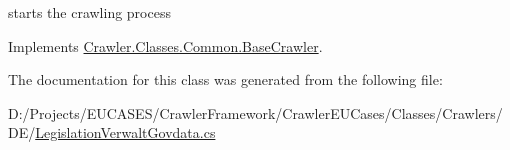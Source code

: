 starts the crawling process 



Implements \hyperlink{class_crawler_1_1_classes_1_1_common_1_1_base_crawler_a14b2a286ce7fb2899bd915dd345bf6b7}{Crawler.\-Classes.\-Common.\-Base\-Crawler}.



The documentation for this class was generated from the following file\-:\begin{DoxyCompactItemize}
\item 
D\-:/\-Projects/\-E\-U\-C\-A\-S\-E\-S/\-Crawler\-Framework/\-Crawler\-E\-U\-Cases/\-Classes/\-Crawlers/\-D\-E/\hyperlink{_legislation_verwalt_govdata_8cs}{Legislation\-Verwalt\-Govdata.\-cs}\end{DoxyCompactItemize}
